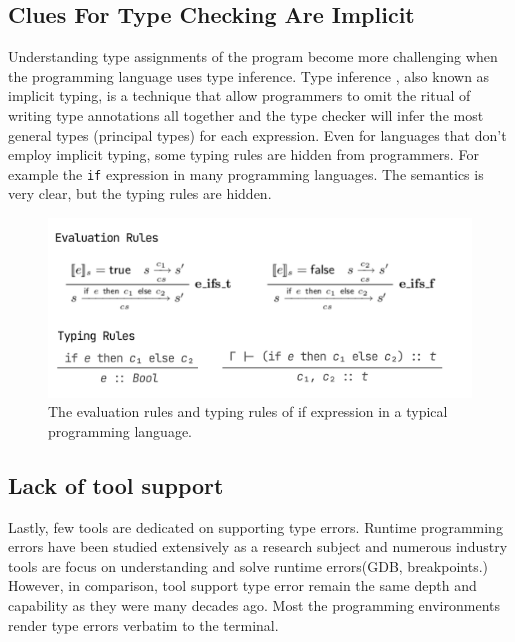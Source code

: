 \subsection{Clues For Type Checking Are Implicit}
Understanding type assignments of the program become more challenging when the programming language uses type inference.  Type inference \cite{Damas1982-sc},  also known as implicit typing,  is a technique that allow programmers to omit the ritual of writing type annotations all together and the type checker will infer the most general types (principal types) for each expression. Even for languages that don't employ implicit typing, some typing rules are hidden from programmers.
For example the \texttt{if} expression in many programming languages. The semantics is very clear, but the typing rules are hidden.

\begin{figure}[hbt]
  \includegraphics[width=\linewidth]{IfRules.png}
  \caption{
   The evaluation rules and typing rules of if expression in a typical programming language.
    }
\end{figure}


\subsection{Lack of tool support}
Lastly, few tools are dedicated on supporting type errors. Runtime programming errors have been studied extensively as a research subject and numerous industry tools are focus on understanding and solve runtime errors(GDB, breakpoints.) However, in comparison, tool support type error  remain the same depth and capability as they were many decades ago. Most the programming environments render type errors verbatim to the terminal.   


